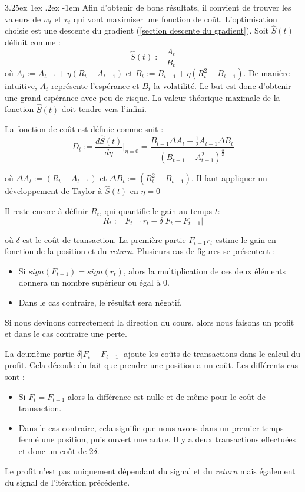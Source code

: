 \documentclass[a4paper, 11pt]{article}
\makeatletter
\renewcommand\paragraph{\@startsection{paragraph}{5}{\z@}%
  {3.25ex \@plus1ex \@minus.2ex}%
  {-1em}%
  {\normalfont\normalsize\bfseries}}
\makeatother
\begin{document}
\paragraph{}
Afin d'obtenir de bons résultats, il convient de trouver les valeurs de $w_t$ et $v_t$ qui vont maximiser une fonction de coût. L'optimisation choisie
est une descente du gradient (\ref{section descente du gradient}).
Soit $\widehat{S}(t)$ définit comme :
$$\widehat{S}(t) := \frac{A_t}{B_t}$$
où $A_t := A_{t-1} + \eta (R_t - A_{t-1})$ et $B_t := B_{t-1} + \eta (R_t^2 - B_{t-1})$.
De manière intuitive, $A_t$ représente l'espérance et $B_t$ la volatilité. Le but est donc d'obtenir une grand espérance avec peu de risque. La valeur
théorique maximale de la fonction $\widehat{S}(t)$ doit tendre vers l'infini.

La fonction de coût est définie comme suit :
$$D_t := \frac{d\widehat{S}(t)}{d\eta}|_{\eta=0} = \frac{B_{t-1}\Delta A_t - \frac{1}{2} A_{t-1}\Delta B_t}{(B_{t-1} - A_{t-1}^2)^{\frac{3}{2}}}$$

où $\Delta A_t := (R_t - A_{t-1})$ et $\Delta B_t := (R_t^2 - B_{t-1})$. Il faut appliquer un développement de Taylor à $\widehat{S}(t)$ en $\eta=0$


Il reste encore à définir $R_t$, qui quantifie le gain au temps $t$:
$$R_t := F_{t-1} r_t - \delta |F_t - F_{t-1}|$$

où $\delta$ est le coût de transaction.
La première partie $F_{t-1} r_t$ estime le gain en fonction de la position et du \textit{return}. Plusieurs cas de figures se présentent :
\begin{itemize}
 \item Si $sign(F_{t-1}) = sign(r_t)$, alors la multiplication de ces deux éléments donnera un nombre supérieur ou égal à 0.
 \item Dans le cas contraire, le résultat sera négatif.
\end{itemize}
Si nous devinons correctement la direction du cours, alors nous faisons un profit et dans le cas contraire une perte.

La deuxième partie $\delta |F_t - F_{t-1}|$ ajoute les coûts de transactions dans le calcul du profit. Cela découle du fait que prendre une position a
un coût. Les différents cas sont :
\begin{itemize}
 \item Si $F_t = F_{t-1}$ alors la différence est nulle et de même pour le coût de transaction.
 \item Dans le cas contraire, cela signifie que nous avons dans un premier temps fermé une position, puis ouvert une autre. Il y a deux transactions
 effectuées et donc un coût de $2 \delta$.
\end{itemize}
Le profit n'est pas uniquement dépendant du signal et du \textit{return} mais également du signal de l'itération précédente.
\end{document}
